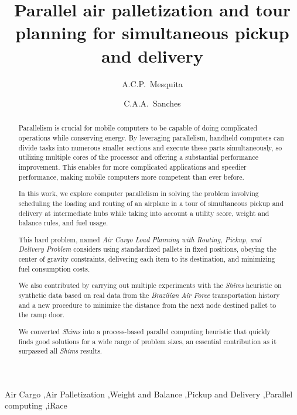 \documentclass[preprint,authoryear]{elsarticle}
\begin{document}
\begin{frontmatter}

\title{Parallel air palletization and tour planning for simultaneous pickup and delivery}

\author{A.C.P.~Mesquita}

\author{C.A.A.~Sanches}

\address {Instituto Tecnol\'{o}gico de Aeron\'{a}utica - DCTA/ITA/IEC\\
Pra\c{c}a Mal. Eduardo Gomes, 50\\
S\~{a}o Jos\'{e} dos Campos - SP - 12.228-900 - Brazil}


\begin{abstract}

Parallelism is crucial for mobile computers to be capable of doing complicated operations while conserving energy. By leveraging parallelism, handheld computers can divide tasks into numerous smaller sections and execute these parts simultaneously, so utilizing multiple cores of the processor and offering a substantial performance improvement. This enables for more complicated applications and speedier performance, making mobile computers more competent than ever before.

In this work, we explore computer parallelism in solving the problem involving scheduling the loading and routing of an airplane in a tour of simultaneous pickup and delivery at intermediate hubs while taking into account a utility score, weight and balance rules, and fuel usage.

This hard problem, named {\it Air Cargo Load Planning with Routing, Pickup, and Delivery Problem} considers using standardized pallets in fixed positions, obeying the center of gravity constraints, delivering each item to its destination, and minimizing fuel consumption costs.

We also contributed by carrying out multiple experiments with the {\it Shims} heuristic on synthetic data based on real data from the {\it Brazilian Air Force} transportation history and a new procedure to minimize the distance from the next node destined pallet to the ramp door.

We converted {\it Shims} into a process-based parallel computing heuristic that quickly finds good solutions for a wide range of problem sizes, an essential contribution as it surpassed all {\it Shims} results.

\end{abstract}

\begin{keyword}
Air Cargo \sep Air Palletization \sep Weight and Balance \sep Pickup and Delivery \sep Parallel computing \sep iRace
\end{keyword}

\end{frontmatter}
\end{document}
